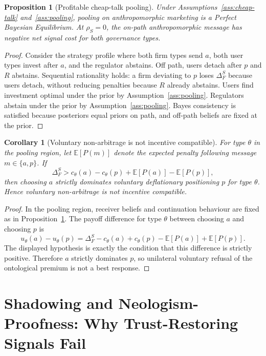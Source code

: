 \documentclass[review,authoryear]{elsarticle}
\newtheorem{proposition}{Proposition}
\newtheorem{corollary}{Corollary}
\theoremstyle{definition}
\theoremstyle{plain}
\begin{document}
\begin{proposition}[Profitable cheap-talk pooling]
\label{prop:pooling-pbe}
\label{thm:pooling}
Under Assumptions~\ref{ass:cheap-talk} and~\ref{ass:pooling}, pooling on anthropomorphic marketing is a Perfect Bayesian Equilibrium.  At $\rho_S=0$, the on-path anthropomorphic message has negative net signal cost for both governance types.
\end{proposition}
\begin{proof}
Consider the strategy profile where both firm types send $a$, both user types invest after $a$, and the regulator abstains.  Off path, users detach after $p$ and $R$ abstains.  Sequential rationality holds: a firm deviating to $p$ loses $\Delta_F^S$ because users detach, without reducing penalties because $R$ already abstains.  Users find investment optimal under the prior by Assumption~\ref{ass:pooling}.  Regulators abstain under the prior by Assumption~\ref{ass:pooling}.  Bayes consistency is satisfied because posteriors equal priors on path, and off-path beliefs are fixed at the prior.
\end{proof}

\begin{corollary}[Voluntary non-arbitrage is not incentive compatible]
\label{cor:voluntary-non-arbitrage}
For type $\theta$ in the pooling region, let $\mathbb{E}[P(m)]$ denote the expected penalty following message $m\in\{a,p\}$. If
\[
\Delta_F^S
>
c_\theta(a)-c_\theta(p)+\mathbb{E}[P(a)]-\mathbb{E}[P(p)],
\]
then choosing $a$ strictly dominates voluntary deflationary positioning $p$ for type $\theta$. Hence voluntary non-arbitrage is not incentive compatible.
\end{corollary}
\begin{proof}
In the pooling region, receiver beliefs and continuation behaviour are fixed as in Proposition~\ref{prop:pooling-pbe}. The payoff difference for type $\theta$ between choosing $a$ and choosing $p$ is
\[
u_\theta(a)-u_\theta(p)
=
\Delta_F^S-c_\theta(a)+c_\theta(p)-\mathbb{E}[P(a)]+\mathbb{E}[P(p)].
\]
The displayed hypothesis is exactly the condition that this difference is strictly positive. Therefore $a$ strictly dominates $p$, so unilateral voluntary refusal of the ontological premium is not a best response.
\end{proof}

\section{Shadowing and Neologism-Proofness: Why Trust-Restoring Signals Fail}
\label{sec:shadowing}
\end{document}
